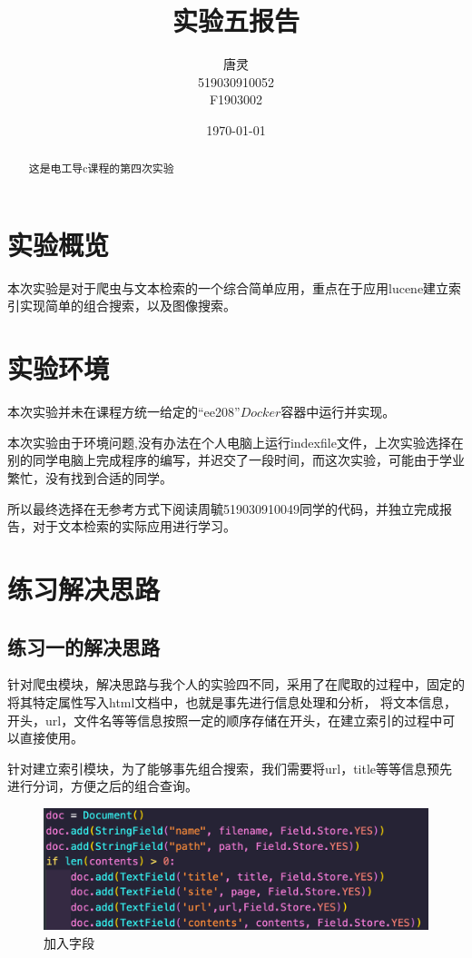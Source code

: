 \documentclass[UTF8]{ctexart}
\title{实验五报告}
\author{唐灵\\519030910052\\F1903002}
\date{\today}
\begin{document}
    \maketitle
    \begin{abstract}
        这是电工导c课程的第四次实验
    \end{abstract}
    \section{实验概览}
        本次实验是对于爬虫与文本检索的一个综合简单应用，重点在于应用lucene建立索引实现简单的组合搜索，以及图像搜索。
    \section{实验环境}
    本次实验并未在课程方统一给定的“ee208”$Docker$容器中运行并实现。

    本次实验由于环境问题,没有办法在个人电脑上运行indexfile文件，上次实验选择在别的同学电脑上完成程序的编写，并迟交了一段时间，而这次实验，可能由于学业繁忙，没有找到合适的同学。

    所以最终选择在无参考方式下阅读周毓519030910049同学的代码，并独立完成报告，对于文本检索的实际应用进行学习。
    \section{练习解决思路}
        \subsection{练习一的解决思路}
            针对爬虫模块，解决思路与我个人的实验四不同，采用了在爬取的过程中，固定的将其特定属性写入html文档中，也就是事先进行信息处理和分析，
            将文本信息，开头，url，文件名等等信息按照一定的顺序存储在开头，在建立索引的过程中可以直接使用。

            针对建立索引模块，为了能够事先组合搜索，我们需要将url，title等等信息预先进行分词，方便之后的组合查询。
            \begin{figure}[ht]
                \centering
                \includegraphics[scale=0.5]{img/str.png}
                \caption{加入字段}
            \end{figure} 
\end{document}
